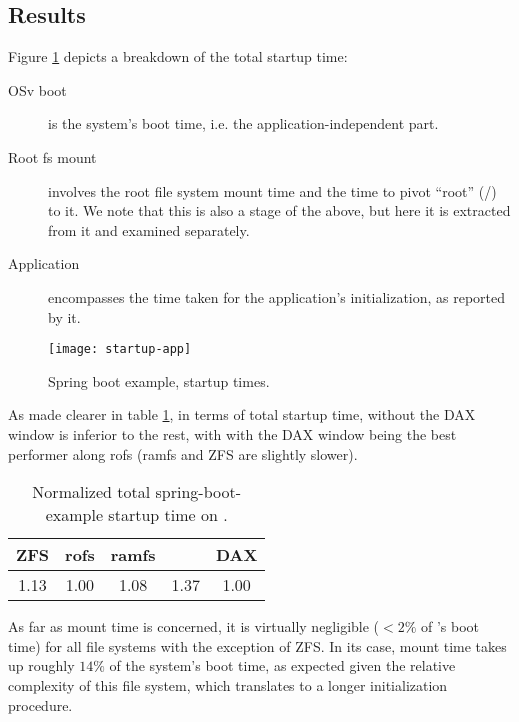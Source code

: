 \subsection{Results}

Figure \ref{fig:startup-app} depicts a breakdown of the total startup time:
\begin{description}
    \item[OSv boot] is the system's boot time, i.e. the application-independent
          part.
    \item[Root fs mount] involves the root file system mount time and the time
          to pivot ``root'' (/) to it. We note that this is also a stage of the
          above, but here it is extracted from it and examined separately.
    \item[Application] encompasses the time taken for the application's
          initialization, as reported by it.
\end{description}

\begin{figure}
    \texttt{[image: startup-app]}
    \caption{Spring boot example, startup times.}
    \label{fig:startup-app}
\end{figure}


As made clearer in table \ref{tab:startup-total}, in terms of total startup
time, \viofs{} without the DAX window is inferior to the rest, with \viofs{}
with the DAX window being the best performer along rofs (ramfs and ZFS are
slightly slower).

\begin{table}
    \centering
    \begin{tabular}{ |c|c|c|c|c| }
        \hline
        ZFS & rofs & ramfs & \viofs{} & \viofs{} DAX \\
        \hline
        1.13 & 1.00 & 1.08 & 1.37 & 1.00 \\
        \hline
    \end{tabular}
    \caption{Normalized total spring-boot-example startup time on \osv{}.}
    \label{tab:startup-total}
\end{table}

As far as mount time is concerned, it is virtually negligible (\(<2\%\) of
\osv{}'s boot time) for all file systems with the exception of ZFS. In its case,
mount time takes up roughly \(14\%\) of the system's boot time, as expected
given the relative complexity of this file system, which translates to a longer
initialization procedure.

